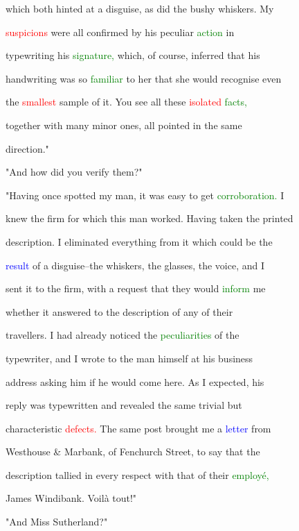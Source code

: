  which both hinted at a disguise, as did the bushy whiskers. My

 \textcolor{red}{suspicions} were all confirmed by his peculiar \textcolor{green}{action} in

 typewriting his \textcolor{green}{signature,} which, of course, inferred that his

 handwriting was so \textcolor{green}{familiar} to her that she would recognise even

 the \textcolor{red}{smallest} sample of it. You see all these \textcolor{red}{isolated} \textcolor{green}{facts,}

 together with many minor ones, all pointed in the same

 direction."



 "And how did you verify them?"



 "Having once spotted my man, it was easy to get \textcolor{green}{corroboration.} I

 knew the firm for which this man worked. Having taken the printed

 description. I eliminated everything from it which could be the

 \textcolor{blue}{result} of a disguise--the whiskers, the glasses, the voice, and I

 sent it to the firm, with a request that they would \textcolor{green}{inform} me

 whether it answered to the description of any of their

 travellers. I had already noticed the \textcolor{green}{peculiarities} of the

 typewriter, and I wrote to the man himself at his business

 address asking him if he would come here. As I \textcolor{BurntOrange}{expected,} his

 reply was typewritten and revealed the same trivial but

 characteristic \textcolor{red}{defects.} The same post brought me a \textcolor{blue}{letter} from

 Westhouse & Marbank, of Fenchurch Street, to say that the

 description tallied in every \textcolor{BurntOrange}{respect} with that of their \textcolor{green}{employé,}

 James Windibank. Voilà tout!"



 "And Miss Sutherland?"



